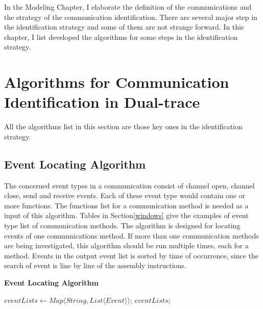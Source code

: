 
\label{chapter:alo}
In the Modeling Chapter, I elaborate the definition of the communications and the strategy of the communication identification. There are several major step in the identification strategy and some of them are not strange forward. In this chapter, I list developed the algorithms for some steps in the identification strategy. 

\section{Algorithms for Communication Identification in Dual-trace}
All the algorithms list in this section are those key ones in the identification strategy. 

\subsection{Event Locating Algorithm}
The concerned event types in a communication consist of channel open, channel close, send and receive events. Each of these event type would contain one or more functions. The functions list for a communication method is needed as a input of this algorithm. Tables in Section\ref{windows} give the examples of event type list of communication methods. The algorithm is designed for locating events of one communications method. If more than one communication methods are being investigated, this algorithm should be run multiple times, each for a method. Events in the output event list is sorted by time of occurrence, since the search of event is line by line of the assembly instructions.

\begin{algorithm}[H]
\DontPrintSemicolon
\caption{{\bf Event Locating Algorithm} \label{eventLocAlg}}
$eventLists \leftarrow Map \langle String, List \langle Event\rangle \rangle$;\; 
\KwRet $eventLists$;\;
\end{algorithm} 

